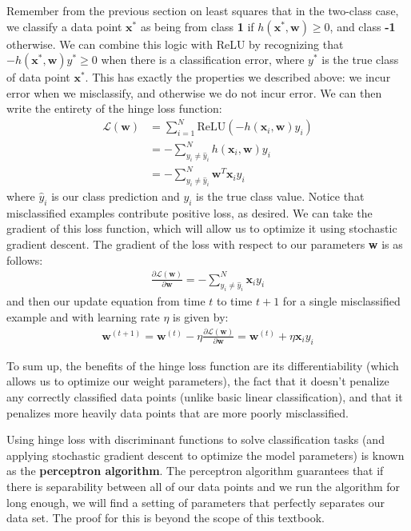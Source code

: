 Remember from the previous section on least squares that in the two-class case, we classify a data point $\textbf{x}^{*}$ as being from class 
\textbf{1} if $h(\textbf{x}^{*}, \textbf{w}) \geq 0$, and class \textbf{-1} otherwise. We can combine this logic with ReLU by recognizing that $-h(\textbf{x}^{*}, \textbf{w})y^{*} \geq 0$ when there is a classification error, where $y^{*}$ is the true class of data point $\textbf{x}^{*}$. This has exactly the properties we described above: we incur error when we misclassify, and otherwise we do not incur error. \newline \newline
We can then write the entirety of the hinge loss function:
\begin{align}
	\mathcal{L}(\textbf{w}) &= \sum_{i=1}^{N} \text{ReLU}(-h(\textbf{x}_{i}, \textbf{w})y_{i}) \\
	&= -\sum_{y_{i} \neq \hat{y}_{i}}^{N} h(\textbf{x}_{i}, \textbf{w})y_{i} \\
	&= -\sum_{y_{i} \neq \hat{y}_{i}}^{N} \textbf{w}^{T}\textbf{x}_{i} y_{i}
\end{align}
where $\hat{y}_{i}$ is our class prediction and $y_{i}$ is the true class value. Notice that misclassified examples contribute positive loss, as desired. We can take the gradient of this loss function, which will allow us to optimize it using stochastic gradient descent. The gradient of the loss with respect to our parameters \textbf{w} is as follows:
\begin{align*}
	\frac{\partial \mathcal{L}(\textbf{w})}{\partial \textbf{w}} = -\sum_{y_{i} \neq \hat{y}_{i}}^{N} \textbf{x}_{i} y_{i}
\end{align*}
and then our update equation from time $t$ to time $t+1$ for a single misclassified example and with learning rate $\eta$ is given by:
\begin{align*}
	\textbf{w}^{(t+1)} = \textbf{w}^{(t)} - \eta\frac{\partial \mathcal{L}(\textbf{w})}{\partial \textbf{w}} = \textbf{w}^{(t)} + \eta \textbf{x}_{i} y_{i}
\end{align*}

To sum up, the benefits of the hinge loss function are its differentiability (which allows us to optimize our weight parameters), the fact that it doesn't penalize any correctly classified data points (unlike basic linear classification), and that it penalizes more heavily data points that are more poorly misclassified.

Using hinge loss with discriminant functions to solve classification tasks (and applying stochastic gradient descent to optimize the model parameters) is known as the \textbf{perceptron algorithm}. The perceptron algorithm guarantees that if there is separability between all of our data points and we run the algorithm for long enough, we will find a setting of parameters that perfectly separates our data set. The proof for this is beyond the scope of this textbook.

